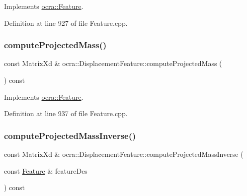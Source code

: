 Implements \hyperlink{classocra_1_1Feature_a44e11dd349e92971fefebff354e7214b}{ocra\+::\+Feature}.



Definition at line 927 of file Feature.\+cpp.

\hypertarget{classocra_1_1DisplacementFeature_a31902186d804823eea5ba0177ed85ced}{}\label{classocra_1_1DisplacementFeature_a31902186d804823eea5ba0177ed85ced} 
\subsubsection{\texorpdfstring{compute\+Projected\+Mass()}{computeProjectedMass()}\hspace{0.1cm}{\footnotesize\ttfamily [2/2]}}
{\footnotesize\ttfamily const Matrix\+Xd \& ocra\+::\+Displacement\+Feature\+::compute\+Projected\+Mass (\begin{DoxyParamCaption}{ }\end{DoxyParamCaption}) const\hspace{0.3cm}{\ttfamily [virtual]}}



Implements \hyperlink{classocra_1_1Feature_a99ac023809c0cf34b5d582537934b08c}{ocra\+::\+Feature}.



Definition at line 937 of file Feature.\+cpp.

\hypertarget{classocra_1_1DisplacementFeature_a4b2e46d41b46c9af72f21f6dcdeec5f5}{}\label{classocra_1_1DisplacementFeature_a4b2e46d41b46c9af72f21f6dcdeec5f5} 
\subsubsection{\texorpdfstring{compute\+Projected\+Mass\+Inverse()}{computeProjectedMassInverse()}\hspace{0.1cm}{\footnotesize\ttfamily [1/2]}}
{\footnotesize\ttfamily const Matrix\+Xd \& ocra\+::\+Displacement\+Feature\+::compute\+Projected\+Mass\+Inverse (\begin{DoxyParamCaption}\item[{const \hyperlink{classocra_1_1Feature}{Feature} \&}]{feature\+Des }\end{DoxyParamCaption}) const\hspace{0.3cm}{\ttfamily [virtual]}}



